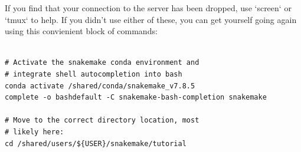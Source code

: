 If you find that your connection to the server has been dropped, use `screen` or `tmux` to help.
If you didn't use either of these, you can get yourself going again using this convienient block of commands:

\begin{lstlisting}

# Activate the snakemake conda environment and
# integrate shell autocompletion into bash
conda activate /shared/conda/snakemake_v7.8.5
complete -o bashdefault -C snakemake-bash-completion snakemake

# Move to the correct directory location, most
# likely here:
cd /shared/users/${USER}/snakemake/tutorial
\end{lstlisting}
